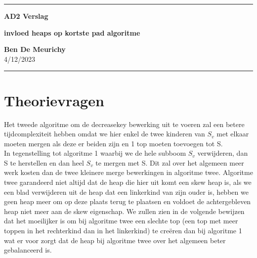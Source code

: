 \documentclass[10pt,a4paper,twoside]{article}
\begin{document}
\begin{center}
\hrule

\vspace{.4cm}
{\bf {\Huge AD2 Verslag}}
\vspace{.2cm}
\end{center}
\begin{center}
{\bf{\Large invloed heaps op kortste pad algoritme}}
\end{center}
{\bf Ben De Meurichy}  \\
\hspace{\fill} 4/12/2023 \\
\hrule


\section{ Theorievragen}
Het tweede algoritme om de decreasekey bewerking uit te voeren zal een betere tijdcomplexiteit hebben omdat we hier enkel de twee kinderen van $S_v$ met elkaar moeten mergen als deze er beiden zijn en 1 top moeten toevoegen tot S.\\
In tegenstelling tot algoritme 1 waarbij we de hele subboom $S_v$ verwijderen, dan S te herstellen en dan heel $S_v$ te mergen met S. Dit zal over het algemeen meer werk kosten dan de twee kleinere merge bewerkingen in algoritme twee.
Algoritme twee garandeerd niet altijd dat de heap die hier uit komt een skew heap is, als we een blad verwijderen uit de heap dat een linkerkind van zijn ouder is, hebben we geen heap meer om op deze plaats terug te plaatsen en voldoet de achtergebleven heap niet meer aan de skew eigenschap. We zullen zien in de volgende bewijzen dat het moeilijker is om bij algoritme twee een slechte top (een top met meer toppen in het rechterkind dan in het linkerkind) te creëren dan bij algoritme 1 wat er voor zorgt dat de heap bij algoritme twee over het algemeen beter gebalanceerd is.
\end{document}
